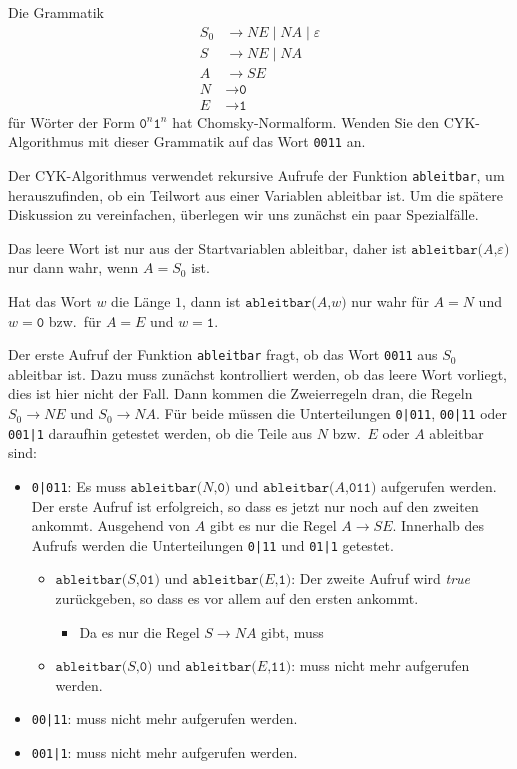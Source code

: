 Die Grammatik
\begin{align*}
S_0& \to NE \mid NA \mid \varepsilon \\
S  & \to NE \mid NA \\
A  &\to SE \\
N&\to \texttt{0} \\
E&\to \texttt{1} 
\end{align*}
für Wörter der Form
$\texttt{0}^n\texttt{1}^n$
hat Chomsky-Normalform.
Wenden Sie den CYK-Algorithmus mit dieser Grammatik auf das Wort
\texttt{0011} an.

\def\ableitbar#1#2{
	\texttt{ableitbar(}#1\texttt{,}#2\texttt{)}
}

\begin{loesung}
Der CYK-Algorithmus verwendet rekursive Aufrufe der Funktion
\texttt{ableitbar}, um herauszufinden, ob ein Teilwort aus einer 
Variablen ableitbar ist.
Um die spätere Diskussion zu vereinfachen, überlegen wir uns zunächst
ein paar Spezialfälle.

Das leere Wort ist nur aus der Startvariablen ableitbar, daher ist
$\ableitbar{A}{\varepsilon}$ nur dann wahr, wenn $A=S_0$ ist.

Hat das Wort $w$ die Länge $1$, dann ist 
$\ableitbar{A}{w}$ nur wahr
für $A=N$ und $w=\texttt{0}$
bzw.~für $A=E$ und $w=\texttt{1}$.

Der erste Aufruf der Funktion \texttt{ableitbar} fragt, ob das Wort
\texttt{0011} aus $S_0$ ableitbar ist.
Dazu muss zunächst kontrolliert werden, ob das leere Wort vorliegt,
dies ist hier nicht der Fall.
Dann kommen die Zweierregeln dran, die Regeln
$S_0\to NE$
und
$S_0\to NA$.
Für beide müssen die Unterteilungen
\texttt{0|011},
\texttt{00|11} oder
\texttt{001|1}
daraufhin getestet werden, ob die Teile aus $N$ bzw.~$E$ oder $A$
ableitbar sind:
\begin{itemize}
\item
\texttt{0|011}:
Es muss $\ableitbar{N}{\texttt{0}}$ und $\ableitbar{A}{\texttt{011}}$ 
aufgerufen werden.
Der erste Aufruf ist erfolgreich, so dass es jetzt nur noch auf den
zweiten ankommt.
Ausgehend von $A$ gibt es nur die Regel $A\to SE$.
Innerhalb des Aufrufs werden die Unterteilungen
\texttt{0|11} 
und
\texttt{01|1} 
getestet.
\begin{itemize}
\item
$\ableitbar{S}{\texttt{01}}$ und $\ableitbar{E}{\texttt{1}}$:
Der zweite Aufruf wird {\em true} zurückgeben, so dass es vor allem
auf den ersten ankommt.
\begin{itemize}
\item
Da es nur die Regel $S\to NA$ gibt, muss 
\end{itemize}
\item
$\ableitbar{S}{\texttt{0}}$ und $\ableitbar{E}{\texttt{11}}$:
muss nicht mehr aufgerufen werden.
\end{itemize}
\item
\texttt{00|11}: muss nicht mehr aufgerufen werden.
\item
\texttt{001|1}: muss nicht mehr aufgerufen werden.
\end{itemize}



\end{loesung}
